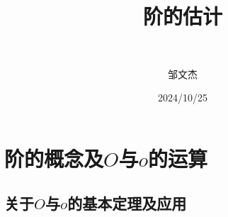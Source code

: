 \documentclass[lang=cn,newtx,10pt,scheme=chinese]{elegantbook}
\title{阶的估计}
\subtitle{\,\,}
\author{邹文杰}
\institute{无}
\date{2024/10/25}
\begin{document}
\maketitle
\frontmatter

\tableofcontents

\mainmatter
\everymath{\displaystyle} %

\chapter{阶的概念及$O$与$o$的运算}

\section{关于$O$与$o$的基本定理及应用}
\end{document}
